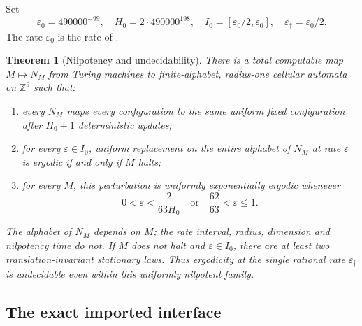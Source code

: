 \documentclass[11pt]{article}
\theoremstyle{plain}
\newtheorem{theorem}{Theorem}[section]
\theoremstyle{definition}
\theoremstyle{remark}
\newcommand{\Z}{\mathbb Z}
\newcommand{\eps}{\varepsilon}
\begin{document}
Set
\begin{equation}\label{eq:nu-constants}
 \eps_0=490000^{-99},\quad H_0=2\cdot490000^{198},\quad
 I_0=[\eps_0/2,\eps_0],\quad \eps_\dagger=\eps_0/2.
\end{equation}
The rate $\eps_0$ is the rate of \cite[Corollary~9.21]{DM26A}.

\begin{theorem}[Nilpotency and undecidability]\label{thm:nu-main}
There is a total computable map $M\mapsto N_M$ from Turing machines to finite-alphabet, radius-one cellular automata on $\Z^9$ such that:
\begin{enumerate}[label=\textup{(\roman*)}]
\item every $N_M$ maps every configuration to the same uniform fixed configuration after $H_0+1$ deterministic updates;
\item for every $\eps\in I_0$, uniform replacement on the entire alphabet of $N_M$ at rate $\eps$ is ergodic if and only if $M$ halts;
\item for every $M$, this perturbation is uniformly exponentially ergodic whenever
\[
 0<\eps<\frac{2}{63H_0}\quad\text{or}\quad\frac{62}{63}<\eps\le1.
\]
\end{enumerate}
The alphabet of $N_M$ depends on $M$; the rate interval, radius, dimension and nilpotency time do not. If $M$ does not halt and $\eps\in I_0$, there are at least two translation-invariant stationary laws. Thus ergodicity at the single rational rate $\eps_\dagger$ is undecidable even within this uniformly nilpotent family.
\end{theorem}

\subsection{The exact imported interface}
\end{document}
